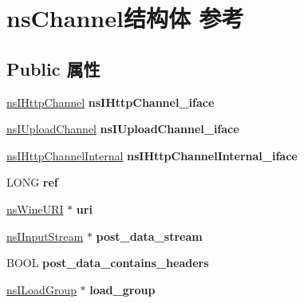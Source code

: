 \hypertarget{structns_channel}{}\section{ns\+Channel结构体 参考}
\label{structns_channel}
\subsection*{Public 属性}
\begin{DoxyCompactItemize}
\item 
\mbox{\label{structns_channel_abee41536131e5e6c1bcb6ad0a2d1ac71}} 
\hyperlink{interfacens_i_http_channel}{ns\+I\+Http\+Channel} {\bfseries ns\+I\+Http\+Channel\+\_\+iface}
\item 
\mbox{\label{structns_channel_a95363663ac87f344e420ec38579d432d}} 
\hyperlink{interfacens_i_upload_channel}{ns\+I\+Upload\+Channel} {\bfseries ns\+I\+Upload\+Channel\+\_\+iface}
\item 
\mbox{\label{structns_channel_acb6577b7436b8ea570fe88e5da76f374}} 
\hyperlink{interfacens_i_http_channel_internal}{ns\+I\+Http\+Channel\+Internal} {\bfseries ns\+I\+Http\+Channel\+Internal\+\_\+iface}
\item 
\mbox{\label{structns_channel_a4a90dec791487056d0613607a2be4faf}} 
L\+O\+NG {\bfseries ref}
\item 
\mbox{\label{structns_channel_aa3b7b419b5b940b2f2e194e867fbfac5}} 
\hyperlink{structns_wine_u_r_i}{ns\+Wine\+U\+RI} $\ast$ {\bfseries uri}
\item 
\mbox{\label{structns_channel_a999d6d8d521b66bfaf2c56389ce90386}} 
\hyperlink{interfacens_i_input_stream}{ns\+I\+Input\+Stream} $\ast$ {\bfseries post\+\_\+data\+\_\+stream}
\item 
\mbox{\label{structns_channel_aef048724e57cd4b52dffaabb9f2c32ae}} 
B\+O\+OL {\bfseries post\+\_\+data\+\_\+contains\+\_\+headers}
\item 
\mbox{\label{structns_channel_a53a9d653791f786274c43142115c7fef}} 
\hyperlink{interfacens_i_load_group}{ns\+I\+Load\+Group} $\ast$ {\bfseries load\+\_\+group}

\end{DoxyCompactItemize}
